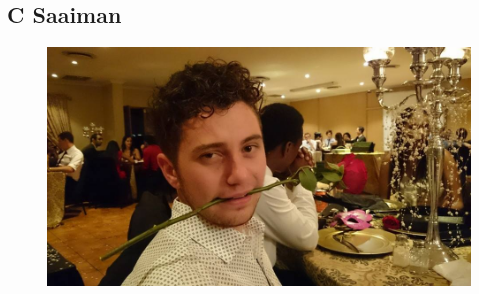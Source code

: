\documentclass{article}
\begin{document}
		\subsection{C Saaiman}
	\begin{figure}[h]
		\centering
		\includegraphics[height=0.3\textheight]{../Saaiman.jpg}
	\end{figure}
    
\end{document}
